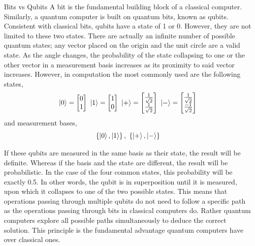 \documentclass[final, 20pt]{beamer}
\newlength{\onecolwid}
\begin{document}
\begin{frame}[t]
\begin{columns}[t]
\begin{column}{\onecolwid}
\begin{block}{Bits vs Qubits}
A bit is the fundamental building block of a classical computer. Similarly, a quantum computer is built on quantum bits, known as qubits. Consistent with classical bits, qubits have a state of 1 or 0. However, they are not limited to these two states. There are actually an infinite number of possible quantum states; any vector placed on the origin and the unit circle are a valid state. As the angle changes, the probability of the state collapsing to one or the other vector in a measurement basis increases as its proximity to said vector increases.  However, in computation the most commonly used are the following states,
	\begin{equation}
		\ket{0}=  \begin{bmatrix} 0 \\ 1 \\ \end{bmatrix} \
		\ket{1}=  \begin{bmatrix} 1 \\ 0 \\ \end{bmatrix} \
		\ket{+}=  \begin{bmatrix} \frac{1}{\sqrt{2}} \\ \frac{1}{\sqrt{2}} \\ \end{bmatrix} \
		\ket{-}=  \begin{bmatrix} \frac{1}{\sqrt{2}} \\ \frac{-1}{\sqrt{2}} \\ \end{bmatrix}
	\end{equation} 
	and measurement bases,
	\begin{equation}
		\left\lbrace \ket{0},\ket{1}\right\rbrace, \ \left\lbrace \ket{+},\ket{-}\right\rbrace 
	\end{equation}
	
	 If these qubits are measured in the same basis as their state, the result will be definite. Whereas if the basis and the state are different, the result will be probabilistic. In the case of the four common states, this probability will be exactly 0.5. In other words, the qubit is in superposition until it is measured, upon which it collapses to one of the two possible states. This means that operations passing through multiple qubits do not need to follow a specific path as the operations passing through bits in classical computers do. Rather quantum computers explore all possible paths simultaneously to deduce the correct solution. This principle is the fundamental advantage quantum computers have over classical ones. 
	

\end{block}
\end{column}
\end{columns}
\end{frame}
\end{document}
